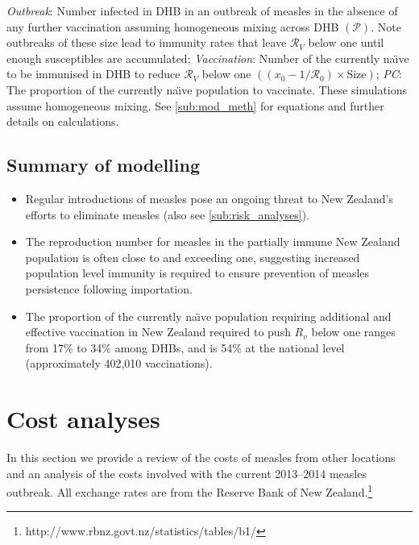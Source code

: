 \documentclass{article}
\newcommand{\Pe}{\mathcal{P}}
\newcommand{\Ro}{\mathcal{R}_0}
\newcommand{\Rr}{\mathcal{R}}
\begin{document}
\begin{table}
{\textit{Outbreak}: Number infected in DHB in an outbreak of measles in the absence of any further vaccination assuming homogeneous mixing across DHB $\left(\Pe\right)$. Note outbreaks of these size lead to immunity rates that leave $\Rr_V$ below one until enough susceptibles are accumulated;	
\textit{Vaccination}:	Number of the currently na\"{\i}ve to be immunised in DHB to reduce $\Rr_V$ below one  $\left(\left(x_0-1/\Ro\right)\times\text{Size}\right)$; \textit{PC}: The proportion of the currently na\"{\i}ve population to vaccinate. These simulations assume homogeneous mixing. See \autoref{sub:mod_meth} for equations and further details on calculations.
}
\label{table:attack}
\end{table}

\subsection{Summary of modelling}
\begin{itemize}
\item Regular introductions of measles pose an ongoing threat to New Zealand's efforts to eliminate measles (also see \autoref{sub:risk_analyses}).
\item The reproduction number for measles in the partially immune New Zealand population is often close to and exceeding one, suggesting increased population level immunity is required to ensure prevention of measles persistence following importation.
 \item The proportion of the currently na\"{\i}ve population requiring additional and effective vaccination in New Zealand required to push $R_v$ below one ranges from 17\% to 34\% among DHBs, and is 54\% at the national level (approximately 402,010 vaccinations).
\end{itemize}

\section{Cost analyses}
\label{sec:cb}

In this section we provide a review of the costs of measles from other locations and an analysis of the costs involved with the current 2013--2014 measles outbreak. All exchange rates are from the Reserve Bank of New Zealand.\footnote{http://www.rbnz.govt.nz/statistics/tables/b1/}
\end{document}
